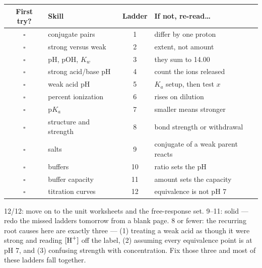\documentclass{apchem-worksheet}
\begin{document}
\renewcommand{\arraystretch}{1.30}
\noindent\begin{tabular}{@{}c p{6.0cm} c >{\raggedright\arraybackslash}p{4.9cm}@{}}
\toprule
\textbf{First try?} & \textbf{Skill} & \textbf{Ladder} &
  \textbf{If not, re-read\ldots}\\
\midrule
$\square$ & conjugate pairs & 1 & differ by one proton \\
$\square$ & strong versus weak & 2 & extent, not amount \\
$\square$ & pH, pOH, $K_w$ & 3 & they sum to 14.00 \\
$\square$ & strong acid/base pH & 4 & count the ions released \\
$\square$ & weak acid pH & 5 & $K_a$ setup, then test $x$ \\
$\square$ & percent ionization & 6 & rises on dilution \\
$\square$ & p$K_a$ & 7 & smaller means stronger \\
$\square$ & structure and strength & 8 & bond strength or withdrawal \\
$\square$ & salts & 9 & conjugate of a weak parent reacts \\
$\square$ & buffers & 10 & ratio sets the pH \\
$\square$ & buffer capacity & 11 & amount sets the capacity \\
$\square$ & titration curves & 12 & equivalence is not pH 7 \\
\bottomrule
\end{tabular}

\begin{apcnote}
12/12: move on to the unit worksheets and the free-response set.
9--11: solid --- redo the missed ladders tomorrow from a blank page.
8 or fewer: the recurring root causes here are exactly three ---
(1) treating a weak acid as though it were strong and reading
$[\ce{H+}]$ off the label, (2) assuming every equivalence point is at
pH 7, and (3) confusing strength with concentration. Fix those three and
most of these ladders fall together.
\end{apcnote}
\end{document}
